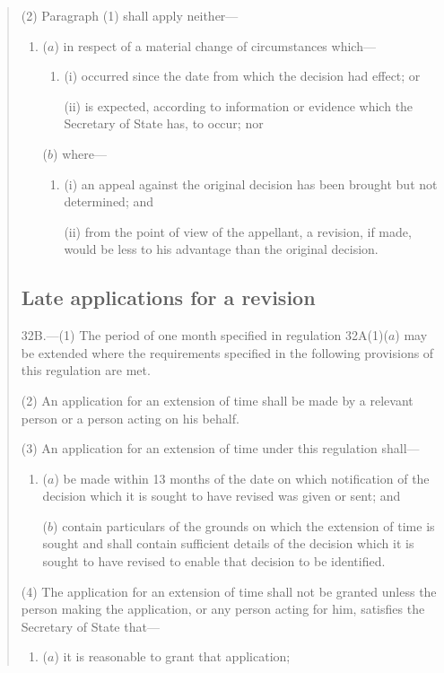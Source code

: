 \documentclass[12pt,a4paper]{article}
\begin{document}
\begin{quotation}
(2) Paragraph (1) shall apply neither---
\begin{enumerate}\item[]
\begin{sloppypar}
($a$) in respect of a material change of circumstances which—
\end{sloppypar}
\begin{enumerate}\item[]
(i) occurred since the date from which the decision had effect; or

(ii) is expected, according to information or evidence which the Secretary of State has, to occur; nor
\end{enumerate}

($b$) where---
\begin{enumerate}\item[]
(i) an appeal against the original decision has been brought but not determined; and

(ii) from the point of view of the appellant, a revision, if made, would be less to his advantage than the original decision.
\end{enumerate}
\end{enumerate}

\subsection*{Late applications for a revision}

32B.—(1) The period of one month specified in regulation 32A(1)($a$) may be extended where the requirements specified in the following provisions of this regulation are met.

(2) An application for an extension of time shall be made by a relevant person or a person acting on his behalf.

(3) An application for an extension of time under this regulation shall---
\begin{enumerate}\item[]
($a$) be made within 13 months of the date on which notification of the decision which it is sought to have revised was given or sent; and

($b$) contain particulars of the grounds on which the extension of time is sought and shall contain sufficient details of the decision which it is sought to have revised to enable that decision to be identified.
\end{enumerate}

(4) The application for an extension of time shall not be granted unless the person making the application, or any person acting for him, satisfies the Secretary of State that---
\begin{enumerate}\item[]
($a$) it is reasonable to grant that application;


\end{enumerate}
\end{quotation}
\end{document}
